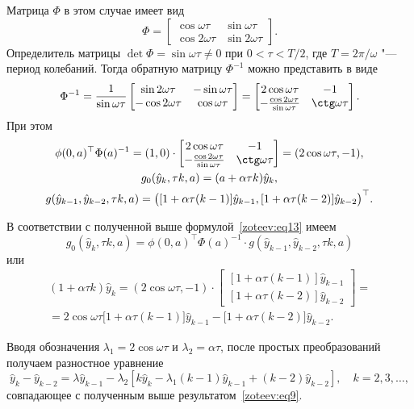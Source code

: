 Матрица $\Phi$ в этом случае имеет вид
$$
\Phi=\begin{bmatrix}
\cos\omega\tau & \sin\omega\tau \\
\cos2\omega\tau & \sin2\omega\tau
\end{bmatrix}.
$$
Определитель матрицы $\det \Phi=\sin\omega\tau \neq 0 $ при $0<\tau<{T}/{2}$, где $T={2\pi}/{\omega}$ "--- период колебаний. Тогда обратную матрицу $\Phi^{-1}$ можно представить в виде
$$
\Phi^{-1}=\dfrac{1}{\sin\omega\tau}\begin{bmatrix}
\sin2\omega\tau &-\sin\omega\tau \\
-\cos2\omega\tau &\cos\omega\tau
\end{bmatrix}=\begin{bmatrix}
2\cos\omega\tau & -1 \\
-\frac{\cos2\omega\tau}{\sin\omega\tau} & \ctg\omega\tau
\end{bmatrix}.
$$
При этом
\begin{gather}
\phi(0,a)^{\top}\Phi(a)^{-1}=(1,0) \cdot \begin{bmatrix}
2\cos\omega\tau & -1 \\
-\frac{\cos2\omega\tau}{\sin\omega\tau} & \ctg\omega\tau
\end{bmatrix}=(2\cos\omega\tau,-1),
\\
g_0(\hat{y}_k,\tau k,a)=(a+\alpha\tau k)\hat{y}_k,
\\
g(\hat{y}_{k-1},\hat{y}_{k-2},\tau k,a)=\bigl([1+\alpha\tau(k-1)]\hat{y}_{k-1},[1+\alpha\tau(k-2)]\hat{y}_{k-2}\bigr)^{\top}.
\end{gather}

В соответствии с полученной выше формулой~\eqref{zoteev:eq13} имеем
$$
g_0(\hat{y}_k,\tau k,a)=\phi(0,a)^{\top}\Phi(a)^{-1}\cdot g(\hat{y}_{k-1},\hat{y}_{k-2},\tau k,a)
$$
или
\begin{multline}
(1+\alpha\tau k)\hat{y}_k=(2\cos\omega\tau,-1)\cdot \begin{bmatrix}
[1+\alpha\tau(k-1)]\hat{y}_{k-1} \\ [1+\alpha\tau(k-2)]\hat{y}_{k-2}
\end{bmatrix}=
\\
=2\cos\omega\tau\big[1+\alpha\tau(k-1)\big]\hat{y}_{k-1}-\big[1+\alpha\tau(k-2)\big]\hat{y}_{k-2}.
\end{multline}

Вводя обозначения $\lambda_1=2\cos\omega\tau$ и $\lambda_2=\alpha\tau$, после простых преобразований получаем разностное уравнение 
$$\hat{y}_k-\hat{y}_{k-2}=\lambda\hat{y}_{k-1}-\lambda_2[k\hat{y}_k-\lambda_1(k-1)\hat{y}_{k-1}+(k-2)\hat{y}_{k-2}], \quad k=2,3,\dots,$$ 
совпадающее с полученным выше результатом~\eqref{zoteev:eq9}.

